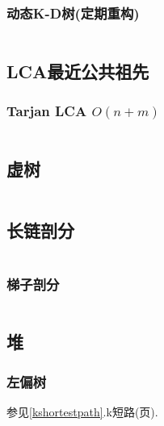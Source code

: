 \documentclass[a4paper, twoside]{article}
\begin{document}
\begin{multicols}{2}
				\subsubsection{动态K-D树(定期重构)}
					\inputminted{cpp}{../src/datastructure/动态KD树.cpp}
	
	
	
			
			\subsection{LCA最近公共祖先}
				\subsubsection{Tarjan LCA $O(n + m)$}
					\inputminted{cpp}{../src/datastructure/tarjanlca.cpp}

			\subsection{虚树}
				\inputminted{cpp}{../src/datastructure/虚树.cpp}
	
			\subsection{长链剖分}
				\inputminted{cpp}{../src/datastructure/长链剖分.cpp}
	
				\subsubsection{梯子剖分}
					\inputminted{cpp}{../src/datastructure/梯子剖分.cpp}
			
			\subsection{堆}

				\subsubsection{左偏树}
					参见\ref{kshortestpath}.k短路(\pageref{kshortestpath}页).
				

\end{multicols}
\end{document}
